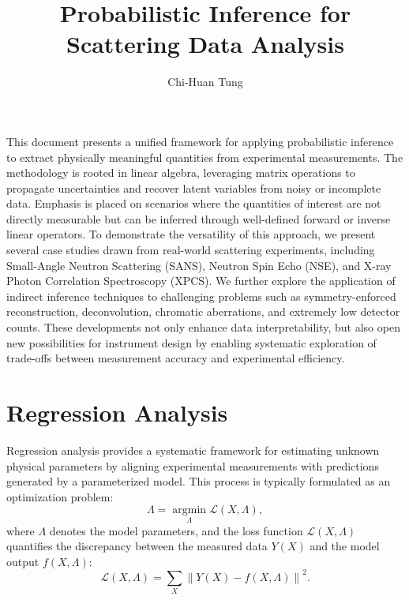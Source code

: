 \documentclass[12pt]{article}
\title{Probabilistic Inference for Scattering Data Analysis}
\author{Chi-Huan Tung}
\begin{document}
\maketitle

This document presents a unified framework for applying probabilistic inference to extract physically meaningful quantities from experimental measurements. The methodology is rooted in linear algebra, leveraging matrix operations to propagate uncertainties and recover latent variables from noisy or incomplete data. Emphasis is placed on scenarios where the quantities of interest are not directly measurable but can be inferred through well-defined forward or inverse linear operators. To demonstrate the versatility of this approach, we present several case studies drawn from real-world scattering experiments, including Small-Angle Neutron Scattering (SANS), Neutron Spin Echo (NSE), and X-ray Photon Correlation Spectroscopy (XPCS). We further explore the application of indirect inference techniques to challenging problems such as symmetry-enforced reconstruction, deconvolution, chromatic aberrations, and extremely low detector counts. These developments not only enhance data interpretability, but also open new possibilities for instrument design by enabling systematic exploration of trade-offs between measurement accuracy and experimental efficiency.

\section{Regression Analysis}

Regression analysis provides a systematic framework for estimating unknown physical parameters by aligning experimental measurements with predictions generated by a parameterized model. This process is typically formulated as an optimization problem:
\begin{equation}
    \Lambda = \operatorname*{argmin}_\Lambda \mathcal{L}(X, \Lambda),
\end{equation}
where \( \Lambda \) denotes the model parameters, and the loss function \( \mathcal{L}(X, \Lambda) \) quantifies the discrepancy between the measured data \( Y(X) \) and the model output \( f(X, \Lambda) \):
\begin{equation}
    \mathcal{L}(X, \Lambda) = \sum_X \left\lVert Y(X) - f(X, \Lambda) \right\rVert^2.
\end{equation}
\end{document}
